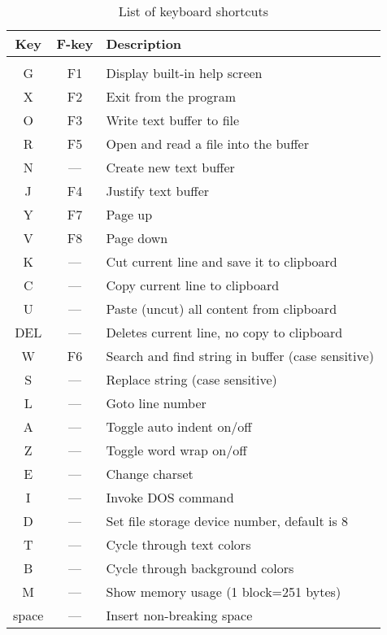 \documentclass{article}
\begin{document}
	\begin{longtable}{c c l}
		\caption{List of keyboard shortcuts} \\
	    \textbf{Key} & \textbf{F-key} & \textbf{Description} \\
	    \hline \\
            G    & F1    & Display built-in help screen \\
            X    & F2    & Exit from the program \\
            O    & F3    & Write text buffer to file \\
            R    & F5    & Open and read a file into the buffer \\
            N    & ---   & Create new text buffer \\
            J    & F4    & Justify text buffer \\
            Y    & F7    & Page up \\
            V    & F8    & Page down \\
            K    & ---   & Cut current line and save it to clipboard \\
            C    & ---   & Copy current line to clipboard \\
            U    & ---   & Paste (uncut) all content from clipboard \\
            DEL  & ---   & Deletes current line, no copy to clipboard \\
            W    & F6    & Search and find string in buffer (case sensitive) \\
            S    & ---   & Replace string (case sensitive) \\
            L    & ---   & Goto line number \\
            A    & ---   & Toggle auto indent on/off \\
            Z    & ---   & Toggle word wrap on/off \\
            E    & ---   & Change charset\\
            I    & ---   & Invoke DOS command\\
            D    & ---   & Set file storage device number, default is 8 \\
            T    &  ---  & Cycle through text colors \\
            B    &  ---  & Cycle through background colors \\
            M    &  ---  & Show memory usage (1 block=251 bytes) \\
            space& ---   & Insert non-breaking space 
        \end{longtable}
\end{document}
